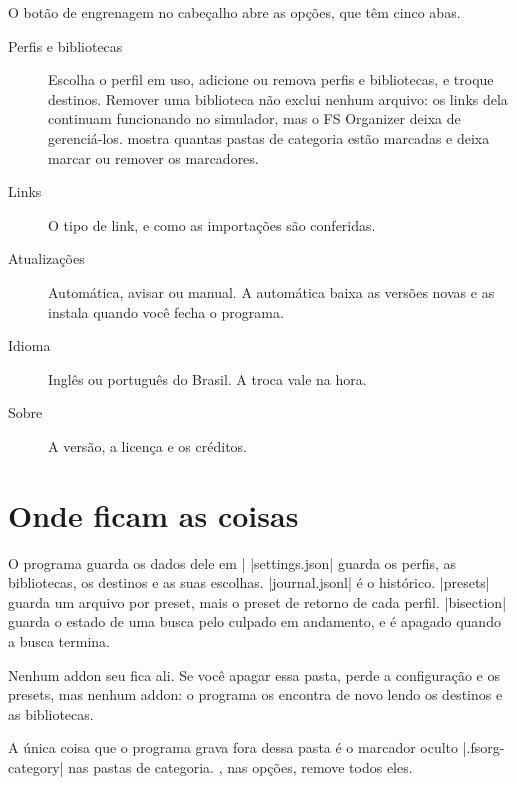 \documentclass[11pt,a4paper]{article}
\begin{document}
O botão de engrenagem no cabeçalho abre as opções, que têm cinco abas.


\begin{description}
  \item[Perfis e bibliotecas] Escolha o perfil em uso, adicione ou remova perfis
    e bibliotecas, e troque destinos. Remover uma biblioteca não exclui nenhum
    arquivo: os links dela continuam funcionando no simulador, mas o FS
    Organizer deixa de gerenciá-los.  mostra quantas pastas de
    categoria estão marcadas e deixa marcar ou remover os marcadores.
  \item[Links] O tipo de link, e como as importações são conferidas.
  \item[Atualizações] Automática, avisar ou manual. A automática baixa as
    versões novas e as instala quando você fecha o programa.
  \item[Idioma] Inglês ou português do Brasil. A troca vale na hora.
  \item[Sobre] A versão, a licença e os créditos.
\end{description}

\section{Onde ficam as coisas}

O programa guarda os dados dele em \where|%
\where|settings.json| guarda os perfis, as bibliotecas, os destinos e as suas
escolhas. \where|journal\operations.jsonl| é o histórico. \where|presets|
guarda um arquivo por preset, mais o preset de retorno de cada perfil.
\where|bisection| guarda o estado de uma busca pelo culpado em andamento, e é
apagado quando a busca termina.

Nenhum addon seu fica ali. Se você apagar essa pasta, perde a configuração e os
presets, mas nenhum addon: o programa os encontra de novo lendo os destinos e as
bibliotecas.

A única coisa que o programa grava fora dessa pasta é o marcador oculto
\where|.fsorg-category| nas pastas de categoria. , nas opções,
remove todos eles.
\end{document}
